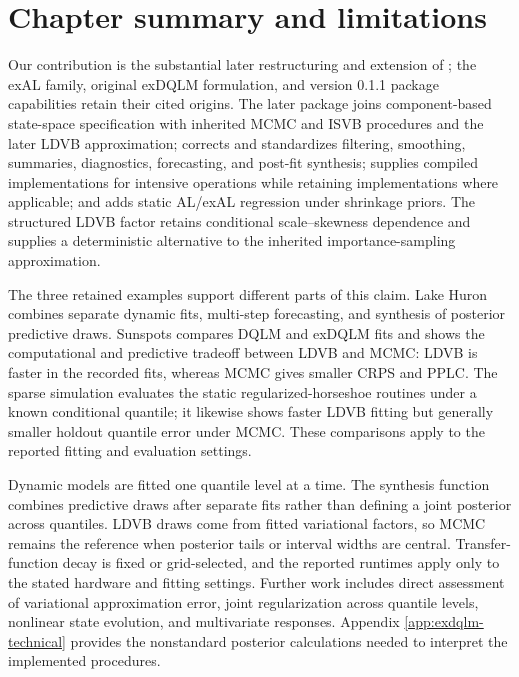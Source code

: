 \section{Chapter summary and limitations}
\label{exd:sec:summary}


Our contribution is the substantial later restructuring and extension of
; the exAL family, original exDQLM formulation, and version 0.1.1
package capabilities retain their cited origins.
The later package joins component-based state-space specification with inherited
MCMC and ISVB procedures and the later LDVB approximation; corrects and
standardizes filtering, smoothing, summaries, diagnostics, forecasting, and
post-fit synthesis; supplies compiled implementations for intensive operations
while retaining  implementations where applicable; and adds static
AL/exAL regression under shrinkage priors. The structured LDVB factor retains
conditional scale--skewness dependence and supplies a deterministic
alternative to the inherited importance-sampling approximation.

The three retained examples support different parts of this claim. Lake Huron
combines separate dynamic fits, multi-step forecasting, and synthesis of
posterior predictive draws. Sunspots compares DQLM and exDQLM fits and shows
the computational and predictive tradeoff between LDVB and MCMC: LDVB is
faster in the recorded fits, whereas MCMC gives smaller CRPS and PPLC. The
sparse simulation evaluates the static regularized-horseshoe routines under
a known conditional quantile; it likewise shows faster LDVB fitting but
generally smaller holdout quantile error under MCMC. These comparisons apply
to the reported fitting and evaluation settings.

Dynamic models are fitted one quantile level at a time. The synthesis function
combines predictive draws after separate fits rather than defining a joint
posterior across quantiles. LDVB
draws come from fitted variational factors, so MCMC remains the reference when
posterior tails or interval widths are central. Transfer-function decay is
fixed or grid-selected, and the reported runtimes apply only to the stated
hardware and fitting settings. Further work includes direct assessment of
variational approximation error, joint regularization across quantile levels,
nonlinear state evolution, and multivariate responses. Appendix
\ref{app:exdqlm-technical} provides the nonstandard posterior calculations
needed to interpret the implemented procedures.
